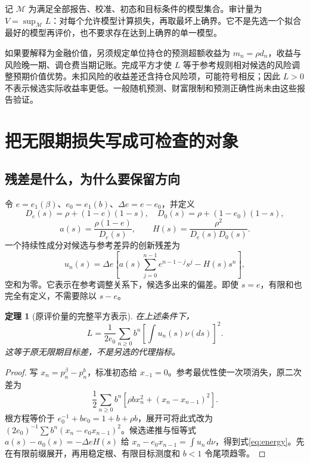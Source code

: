 \documentclass[UTF8,fontset=windows,11pt,a4paper]{ctexart}
\newtheorem{theorem}{定理}
\numberwithin{equation}{section}
\begin{document}
记 $\mathcal M$ 为满足全部报告、校准、初态和目标条件的模型集合。审计量为 $V=\sup_{\mathcal M}L$：对每个允许模型计算损失，再取最坏上确界。它不是先选一个拟合最好的模型再评价，也不要求存在达到上确界的单一模型。

如果要解释为金融价值，另须规定单位持仓的预测超额收益为 $m_n=\rho d_n$，收益与风险晚一期、调仓费当期记账。完成平方才使 $L$ 等于参考规则相对候选的风险调整预期价值优势。未扣风险的收益差还含持仓风险项，可能符号相反；因此 $L>0$ 不表示候选实际收益率更低。一般随机预测、财富限制和预测正确性尚未由这些报告验证。

\section{把无限期损失写成可检查的对象}
\subsection{残差是什么，为什么要保留方向}
令 $e=e_1(\beta)$、$e_0=e_1(b)$、$\Delta e=e-e_0$，并定义
\begin{equation}
 D_e(s)=\rho+(1-e)(1-s),\quad D_0(s)=\rho+(1-e_0)(1-s),
\end{equation}
\begin{equation}
 a(s)=\frac{\rho(1-e)}{D_e(s)},\qquad
 H(s)=\frac{\rho^2}{D_e(s)D_0(s)}.
\end{equation}
一个持续性成分对候选与参考差异的创新残差为
\begin{equation}
 u_n(s)=\Delta e\left[a(s)\sum_{j=0}^{n-1}e^{n-1-j}s^j-H(s)s^n\right],
\end{equation}
空和为零。它表示在参考调整关系下，候选多出来的偏差。即使 $s=e$，有限和也完全有定义，不需要除以 $s-e$。

\begin{theorem}[原评价量的完整平方表示]\label{thm:energy}
在上述条件下，
\begin{equation}\label{eq:energy}
 L=\frac1{2e_0}\sum_{n\ge0}b^n
 \left[\int u_n(s)\nu(ds)\right]^2.
\end{equation}
这等于原无限期目标差，不是另选的代理指标。
\end{theorem}
\begin{proof}
写 $x_n=p_n^\beta-p_n^b$，标准初态给 $x_{-1}=0$。参考最优性使一次项消失，原二次差为
\begin{equation}
 \frac12\sum_{n\ge0}b^n[\rho b x_n^2+(x_n-x_{n-1})^2].
\end{equation}
根方程等价于 $e_0^{-1}+be_0=1+b+\rho b$，展开可将此式改为 $(2e_0)^{-1}\sum b^n(x_n-e_0x_{n-1})^2$。候选递推与恒等式 $a(s)-a_0(s)=-\Delta e H(s)$ 给 $x_n-e_0x_{n-1}=\int u_n\,d\nu$，得到式\eqref{eq:energy}。先在有限前缀展开，再用稳定根、有限目标测度和 $b<1$ 令尾项趋零。
\end{proof}
\end{document}
